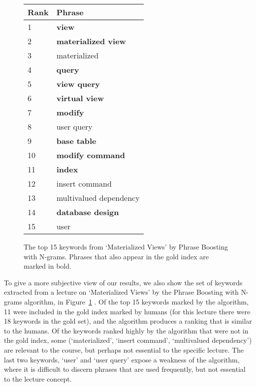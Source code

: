 \begin{figure}[h]
\caption{The top 15 keywords from `Materialized Views' by Phrase
  Boosting with N-grams. Phrases that also appear in the gold index are marked in bold.}
\label{fig:top_15}
\begin{tabular}{|l|l|}
\hline
Rank & Phrase \\
\hline
1 & \textbf{view} \\
\hline
2 & \textbf{materialized view} \\
\hline
3 & materialized \\
\hline
4 & \textbf{query} \\
\hline
5 & \textbf{view query} \\
\hline
6 & \textbf{virtual view} \\
\hline
7 & \textbf{modify} \\
\hline
8 & user query \\
\hline
9 & \textbf{base table} \\
\hline
10 & \textbf{modify command} \\
\hline
11 & \textbf{index} \\
\hline
12 & insert command \\
\hline
13 & multivalued dependency \\
\hline
14 & \textbf{database design} \\
\hline
15 & user \\
\hline
\end{tabular}
\end{figure}

To give a more subjective view of our results, we also show the set of keywords extracted from a lecture on `Materialized Views' by the Phrase Boosting with N-grams algorithm, in Figure~\ref{fig:top_15} . Of the top 15 keywords marked by the algorithm, 11 were included in the gold index marked by humans (for this lecture there were 18 keywords in the gold set), and the algorithm produces a ranking that is similar to the humans. Of the keywords ranked highly by the algorithm that were not in the gold index, some (`materialized', `insert command', `multivalued dependency') are relevant to the course, but perhaps not essential to the specific lecture. The last two keywords, `user' and `user query' expose a weakness of the algorithm, where it is difficult to discern phrases that are used frequently, but not essential to the lecture concept.
